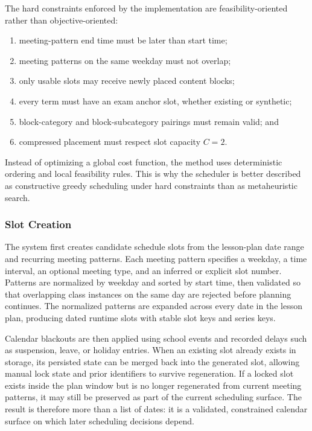 \documentclass[conference]{IEEEtran}
\begin{document}
The hard constraints enforced by the implementation are feasibility-oriented
rather than objective-oriented:
\begin{enumerate}
\item meeting-pattern end time must be later than start time;
\item meeting patterns on the same weekday must not overlap;
\item only usable slots may receive newly placed content blocks;
\item every term must have an exam anchor slot, whether existing or synthetic;
\item block-category and block-subcategory pairings must remain valid; and
\item compressed placement must respect slot capacity \(C=2\).
\end{enumerate}

Instead of optimizing a global cost function, the method uses deterministic
ordering and local feasibility rules. This is why the scheduler is better
described as constructive greedy scheduling under hard constraints than as
metaheuristic search.

\subsubsection{Slot Creation}

The system first creates candidate schedule slots from the lesson-plan date range
and recurring meeting patterns. Each meeting pattern specifies a weekday, a time
interval, an optional meeting type, and an inferred or explicit slot number.
Patterns are normalized by weekday and sorted by start time, then validated so
that overlapping class instances on the same day are rejected before planning
continues. The normalized patterns are expanded across every date in the lesson
plan, producing dated runtime slots with stable slot keys and series keys.

Calendar blackouts are then applied using school events and recorded delays such
as suspension, leave, or holiday entries. When an existing slot already exists in
storage, its persisted state can be merged back into the generated slot, allowing
manual lock state and prior identifiers to survive regeneration. If a locked slot
exists inside the plan window but is no longer regenerated from current meeting
patterns, it may still be preserved as part of the current scheduling surface.
The result is therefore more than a list of dates: it is a validated, constrained
calendar surface on which later scheduling decisions depend.
\end{document}
